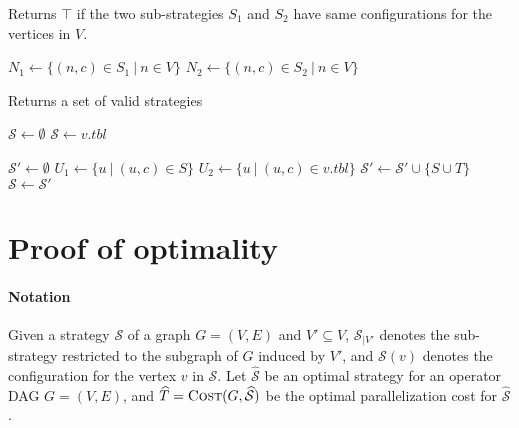 \documentclass{article}
\newcommand{\strategy}{\mathcal{S}}
\newcommand{\optstrategy}{\widehat{\mathcal{S}}}
\newcommand{\optcost}{\widehat{T}}
\newcommand{\vertcost}[1]{t_V(#1)}
\newcommand{\edgecost}[1]{t_E(#1)}
\newcommand{\set}[1]{\{#1\}}
\begin{document}
\begin{algorithm}
	\caption{\label{alg:is-valid}Returns $\top$ if the two
	sub-strategies $S_1$ and $S_2$ have same configurations for the
	vertices in $V$.}

	\begin{algorithmic}[1]
			\State $N_1 \leftarrow \set{(n,c)\in S_1~|~n \in V}$
			\State $N_2 \leftarrow \set{(n,c)\in S_2~|~n \in V}$
			\Statex

				\State \Return{$\bot$}
			\EndIf
			\Statex
			\State \Return{$\top$}
		\EndProcedure
	\end{algorithmic}
\end{algorithm}


\begin{algorithm}
	\caption{\label{alg:valid-strategies} Returns a set of valid strategies}

	\begin{algorithmic}[1]

		\State $\strategy \leftarrow \emptyset$
			\If{$\strategy = \emptyset$}
				\State $\strategy \leftarrow v.tbl$
				\State {}
			\EndIf

			\Statex

			\State $\strategy' \leftarrow \emptyset$
			\ForAll{$S \in \strategy$}
					\State $U_1 \leftarrow \set{u~|~(u,c)\in S}$
					\State $U_2 \leftarrow \set{u~|~(u,c)\in v.tbl}$
					\Statex
						\State $\strategy' \leftarrow \strategy' \cup \set{S\cup T}$
					\EndIf
				\EndFor
			\EndFor
			\State $\strategy \leftarrow \strategy'$
		\EndFor

		\Statex
		\State\Return{$\strategy$}

		\EndProcedure

	\end{algorithmic}
\end{algorithm}

\clearpage

\section{Proof of optimality}
\paragraph{Notation}
Given a strategy $\strategy$ of a graph $G=(V,E)$ and $V'\subseteq V$,
$\strategy_{|V'}$ denotes the sub-strategy restricted to the subgraph of $G$
induced by $V'$, and $\strategy(v)$ denotes the configuration for the vertex $v$
in $\strategy$.  
Let $\optstrategy$ be an optimal strategy for an operator DAG
$G=(V,E)$, and $\optcost = \Call{Cost}{G, \optstrategy}$
be the optimal parallelization cost for $\optstrategy$.
\end{document}
